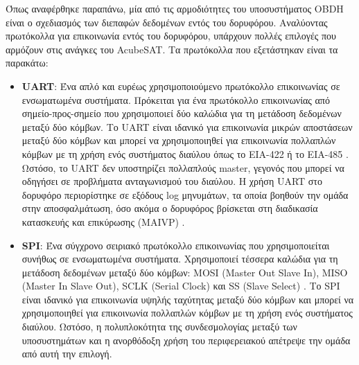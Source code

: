 \documentclass[a4paper,nobib,justified]{tufte-book}
\begin{document}
Όπως αναφέρθηκε παραπάνω, μία από τις αρμοδιότητες του υποσυστήματος OBDH είναι ο σχεδιασμός των διεπαφών δεδομένων εντός του δορυφόρου. 
Αναλύοντας πρωτόκολλα για επικοινωνία εντός του δορυφόρου, υπάρχουν πολλές επιλογές που αρμόζουν στις ανάγκες του AcubeSAT. Τα πρωτόκολλα που εξετάστηκαν είναι τα παρακάτω:
\begin{itemize}
	\item \textbf{UART}: Ένα απλό και ευρέως χρησιμοποιούμενο πρωτόκολλο επικοινωνίας σε ενσωματωμένα συστήματα. Πρόκειται για ένα πρωτόκολλο επικοινωνίας από σημείο-προς-σημείο που χρησιμοποιεί δύο καλώδια για τη μετάδοση δεδομένων μεταξύ δύο κόμβων. Το UART είναι ιδανικό για επικοινωνία μικρών αποστάσεων μεταξύ δύο κόμβων και μπορεί να χρησιμοποιηθεί για επικοινωνία πολλαπλών κόμβων με τη χρήση ενός συστήματος διαύλου όπως το EIA-422 ή το EIA-485 . Ωστόσο, το UART δεν υποστηρίζει πολλαπλούς master, γεγονός που μπορεί να οδηγήσει σε προβλήματα ανταγωνισμού του διαύλου. Η χρήση UART στο δορυφόρο περιορίστηκε σε εξόδους log μηνυμάτων, τα οποία βοηθούν την ομάδα στην αποσφαλμάτωση, όσο ακόμα ο δορυφόρος βρίσκεται στη διαδικασία κατασκευής και επικύρωσης (MAIVP) .
	\item \textbf{SPI}: Ένα σύγχρονο σειριακό πρωτόκολλο επικοινωνίας που χρησιμοποιείται συνήθως σε ενσωματωμένα συστήματα. Χρησιμοποιεί τέσσερα καλώδια για τη μετάδοση δεδομένων μεταξύ δύο κόμβων: MOSI (Master Out Slave In), MISO (Master In Slave Out), SCLK (Serial Clock) και SS (Slave Select) . Το SPI είναι ιδανικό για επικοινωνία υψηλής ταχύτητας μεταξύ δύο κόμβων και μπορεί να χρησιμοποιηθεί για επικοινωνία πολλαπλών κόμβων με τη χρήση ενός συστήματος διαύλου. Ωστόσο, η πολυπλοκότητα της συνδεσμολογίας μεταξύ των υποσυστημάτων και η ανορθόδοξη χρήση του περιφερειακού απέτρεψε την ομάδα από αυτή την επιλογή.

\end{itemize}
\end{document}
